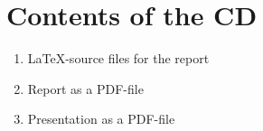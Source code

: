\appendix
\chapter{Contents of the CD}
\begin{enumerate}
    \item \LaTeX-source files for the report
    \item Report as a PDF-file
    \item Presentation as a PDF-file
\end{enumerate}